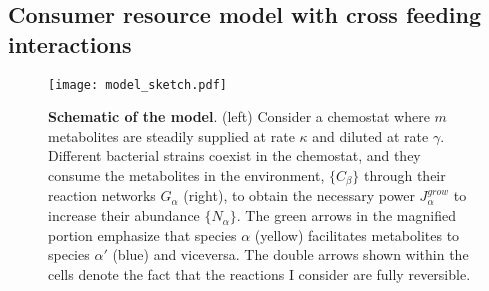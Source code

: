 \documentclass[titlepage,11pt]{article}
\begin{document}
\begin{linenumbers}
\begin{singlespace}
			\subsection{Consumer resource model with cross feeding interactions}
				\begin{figure}[h]
					\centering
					\texttt{[image: model\_sketch.pdf]}
					\caption{\textbf{Schematic of the model}. (left) Consider a chemostat where $ m $ metabolites are steadily supplied at rate $ \kappa $ and diluted at rate $ \gamma $. Different bacterial strains coexist in the chemostat, and they consume the metabolites in the environment, $ \{C_{\beta}\} $ through their reaction networks $ G_{\alpha} $ (right), to obtain the necessary power $ J_{\alpha}^{grow} $ to increase their abundance $ \{N_{\alpha}\} $. The green arrows in the magnified portion emphasize that species $ \alpha $ (yellow) facilitates metabolites to species $ \alpha' $ (blue) and viceversa. The double arrows shown within the cells denote the fact that the reactions I consider are fully reversible.}
					\label{fig:model}
				\end{figure} 
				

\end{singlespace}
\end{linenumbers}
\end{document}

